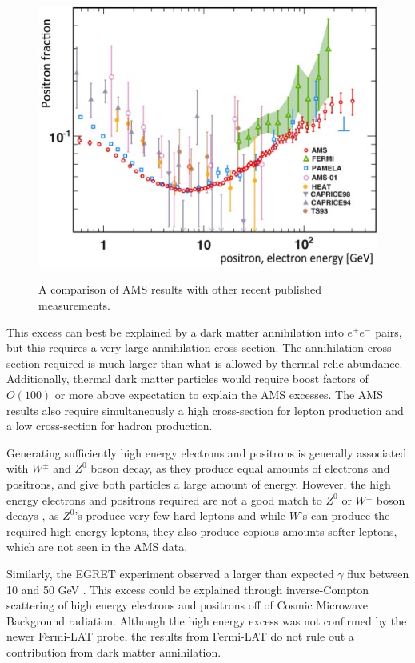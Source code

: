 \begin{figure}
\caption{A comparison of AMS results with other recent published measurements.}
\includegraphics[width=\textwidth]{Paraphotons/AMS_Positron.jpg}
\label{Pam_Graph}
\end{figure}

This excess can best be explained by a dark matter annihilation into $e^+ e^-$ pairs, but this requires a very large annihilation cross-section.  The annihilation cross-section required is much larger than what is allowed by thermal relic abundance. Additionally, thermal dark matter particles would require boost factors of $O(100)$ or more above expectation to explain the AMS excesses. The AMS results also require simultaneously a high cross-section for lepton production and a low cross-section for hadron production. 

Generating sufficiently high energy electrons and positrons is generally associated with $W^{\pm}$ and $Z^{0}$ boson decay, as they produce equal amounts of electrons and positrons, and give both particles a large amount of energy. However, the high energy electrons and positrons required are not a good match to $Z^{0}$ or $W^{\pm}$ boson decays , as $Z^{0}$'s  produce very few hard leptons and while $W$'s can produce the required high energy leptons, they also produce copious amounts softer leptons, which are not seen in the AMS data. 

Similarly, the EGRET experiment  observed a larger than expected $\gamma$ flux between 10 and 50 GeV \cite{EGRET}. This excess could be explained through inverse-Compton scattering of high energy electrons and positrons off of Cosmic Microwave Background radiation. Although the high energy excess was not confirmed by the newer Fermi-LAT probe, the results from Fermi-LAT do not rule out a contribution from dark matter annihilation. 


